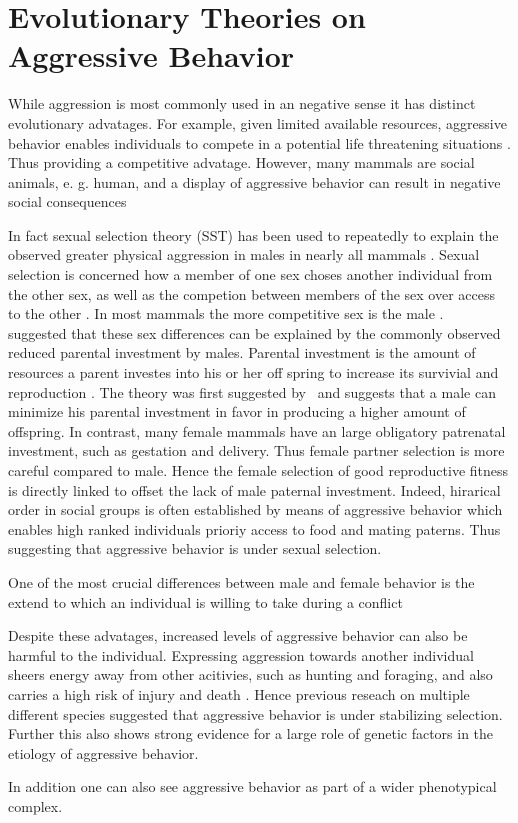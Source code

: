 \section{Evolutionary Theories on Aggressive Behavior}
\label{sec:evolutionary_theories_on_aggressive_behavior}

While aggression is most commonly used in an negative sense it has distinct evolutionary advatages.
For example, given limited available resources, aggressive behavior enables individuals to compete in a potential life threatening situations \cite{Anholt2012}.
Thus providing a competitive advatage.
However, many mammals are social animals, e. g. human, and a display of aggressive behavior can result in negative social consequences %

In fact sexual selection theory (SST) has been used to repeatedly to explain the observed greater physical aggression in males in nearly all mammals	 \cite{Archer2004,Anderson2002}. 
Sexual selection is concerned how a member of one sex choses another individual from the other sex, as well as the competion between members of the sex over access to the other \cite{Darwin1859}.
In most mammals the more competitive sex is the male \cite{Archer2009}. 
~\cite{Trivers1972} suggested that these sex differences can be explained by the commonly observed reduced parental investment by males.
Parental investment is the amount of resources a parent investes into his or her off spring to increase its survivial and reproduction \cite{Archer2009}.
The theory was first suggested by~\cite{0198504403} and suggests that a male can minimize his parental investment in favor in producing a higher amount of offspring.
In contrast, many female mammals have an large obligatory patrenatal investment, such as gestation and delivery.
Thus female partner selection is more careful compared to male.
Hence the female selection of good reproductive fitness is directly linked to offset the lack of male paternal investment.
Indeed, hirarical order in social groups is often established by means of aggressive behavior which enables high ranked individuals prioriy access to food and mating paterns\cite{Lindenfors2011}. 
Thus suggesting that aggressive behavior is under sexual selection.


One of the most crucial differences between male and female behavior is the extend to which an individual is willing to take during a conflict %



Despite these advatages, increased levels of aggressive behavior can also be harmful to the individual.
Expressing aggression towards another individual sheers energy away from other acitivies, such as hunting and foraging, and also carries a high risk of injury and death \cite{Packer1995}.  
Hence previous reseach on multiple different species suggested that aggressive behavior is under stabilizing selection.
Further this also shows strong evidence for a large role of genetic factors in the etiology of aggressive behavior. 


In addition one can also see aggressive behavior as part of a wider phenotypical complex. 


